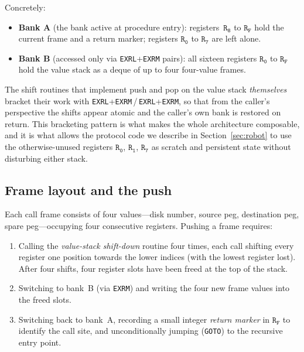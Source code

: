 \documentclass[11pt,a4paper]{article}
\begin{document}
Concretely:

\begin{itemize}
  \item \textbf{Bank A} (the bank active at procedure entry):
    registers~$\mathtt{R_8}$ to $\mathtt{R_F}$ hold the current frame
    and a return marker; registers $\mathtt{R_0}$ to $\mathtt{R_7}$
    are left alone.
  \item \textbf{Bank B} (accessed only via \texttt{EXRL}+\texttt{EXRM}
    pairs): all sixteen registers $\mathtt{R_0}$ to $\mathtt{R_F}$
    hold the value stack as a deque of up to four four-value frames.
\end{itemize}

\noindent
The shift routines that implement push and pop on the value stack
\emph{themselves} bracket their work with
\texttt{EXRL}+\texttt{EXRM}\,/\,\texttt{EXRL}+\texttt{EXRM}, so that
from the caller's perspective the shifts appear atomic and the
caller's own bank is restored on return. This bracketing pattern is
what makes the whole architecture composable, and it is what allows
the protocol code we describe in Section~\ref{sec:robot} to use the
otherwise-unused registers $\mathtt{R_0}$, $\mathtt{R_1}$,
$\mathtt{R_7}$ as scratch and persistent state without disturbing
either stack.

\subsection{Frame layout and the push}

Each call frame consists of four values---disk number, source peg,
destination peg, spare peg---occupying four consecutive registers.
Pushing a frame requires:

\begin{enumerate}
  \item Calling the \emph{value-stack shift-down} routine four times,
    each call shifting every register one position towards the lower
    indices (with the lowest register lost). After four shifts, four
    register slots have been freed at the top of the stack.
  \item Switching to bank~B (via \texttt{EXRM}) and writing the four
    new frame values into the freed slots.
  \item Switching back to bank~A, recording a small integer
    \emph{return marker} in $\mathtt{R_F}$ to identify the call site,
    and unconditionally jumping (\texttt{GOTO}) to the recursive entry
    point.
\end{enumerate}
\end{document}
